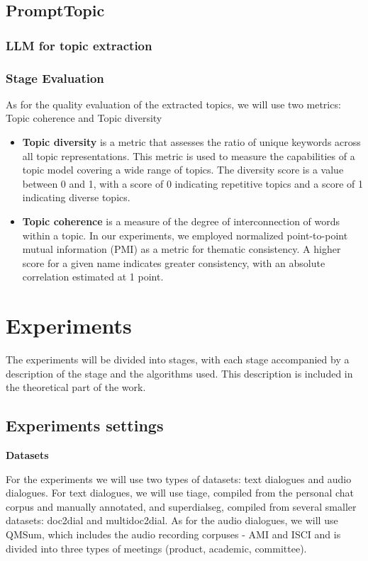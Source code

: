 \documentclass[PMI,VKR]{HSEUniversity}
\begin{document}
\section{PromptTopic}


\subsection{LLM for topic extraction}



\subsection{Stage Evaluation}
As for the quality evaluation of the extracted topics, we will use two metrics: Topic coherence and Topic diversity
\begin{itemize}
    \item \textbf{Topic diversity} \cite{topicdiversity:2019} is a metric that assesses the ratio of unique keywords across all topic representations. This metric is used to measure the capabilities of a topic model covering a wide range of topics. The diversity score is a value between 0 and 1, with a score of 0 indicating repetitive topics and a score of 1 indicating diverse topics.
    \item \textbf{Topic coherence} \cite{topiccoh:2009} is a measure of the degree of interconnection of words within a topic. In our experiments, we employed normalized point-to-point mutual information (PMI) as a metric for thematic consistency. A higher score for a given name indicates greater consistency, with an absolute correlation estimated at 1 point.
    \end{itemize}
\newpage
\chapter{Experiments}

The experiments will be divided into stages, with each stage accompanied by a description of the stage and the algorithms used. 
This description is included in the theoretical part of the work.


\section{Experiments settings}

\textbf{Datasets}

For the experiments we will use two types of datasets: text dialogues and audio dialogues. 
For text dialogues, we will use tiage, compiled from the personal chat corpus and manually annotated, and superdialseg, compiled from several smaller datasets: doc2dial and multidoc2dial. 
As for the audio dialogues, we will use QMSum, which includes the audio recording corpuses - AMI and ISCI and is divided into three types of meetings (product, academic, committee). \\
\end{document}
